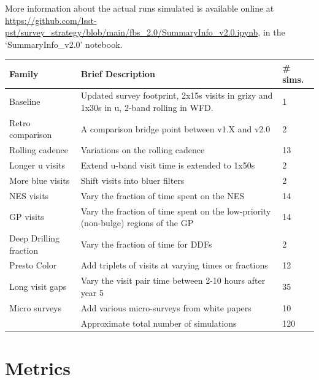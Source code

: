  More information about the actual runs simulated is available online at \url{https://github.com/lsst-pst/survey_strategy/blob/main/fbs_2.0/SummaryInfo_v2.0.ipynb}, in the 
 `SummaryInfo\_v2.0' notebook. 
 
\vskip 0.4in


\begin{table}[]
\begin{tabular}{l | L | l}
Family               & Brief Description       &    \# sims.   \\
\hline\hline
Baseline            & Updated survey footprint, 2x15s visits in grizy and 1x30s in u, 2-band rolling in WFD. &   1     \\
Retro comparison     & A comparison bridge point between v1.X and v2.0  & 2 \\
Rolling cadence      & Variations on the rolling cadence   & 13  \\
Longer u visits  & Extend  u-band visit time is extended to 1x50s    &    2 \\
More blue visits & Shift visits into bluer filters & 2 \\
NES visits & Vary the fraction of time spent on the NES & 14 \\
GP visits & Vary the fraction of time spent on the low-priority (non-bulge) regions of the GP & 14 \\
Deep Drilling fraction & Vary the fraction of time for DDFs & 2 \\
Presto Color & Add triplets of visits at varying times or fractions  & 12 \\
Long visit gaps & Vary the visit pair time between 2-10 hours after year 5  &  35 \\
Micro surveys & Add various micro-surveys from white papers  & 10 \\
\hline
 & Approximate total number of simulations &  120 \\
\hline
\end{tabular}
\end{table}\label{tab:shortlist}


\section{Metrics}

